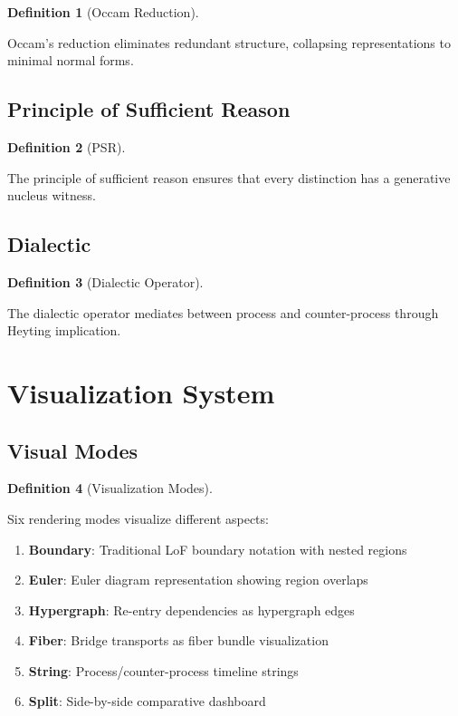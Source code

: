 \documentclass{amsart}
\theoremstyle{definition}
\newtheorem{definition}{Definition}[section]
\theoremstyle{remark}
\begin{document}
\begin{definition}[Occam Reduction]
\label{def:occam}
\uses{}

Occam's reduction eliminates redundant structure, collapsing representations to minimal normal forms.
\end{definition}

\subsection{Principle of Sufficient Reason}
\label{sec:psr}

\begin{definition}[PSR]
\label{def:psr}
\uses{}

The principle of sufficient reason ensures that every distinction has a generative nucleus witness.
\end{definition}

\subsection{Dialectic}
\label{sec:dialectic}

\begin{definition}[Dialectic Operator]
\label{def:dialectic}
\uses{}

The dialectic operator mediates between process and counter-process through Heyting implication.
\end{definition}

\section{Visualization System}

\subsection{Visual Modes}
\label{sec:visual-modes}

\begin{definition}[Visualization Modes]
\label{def:visual-modes}
\uses{}

Six rendering modes visualize different aspects:
\begin{enumerate}
\item \textbf{Boundary}: Traditional LoF boundary notation with nested regions
\item \textbf{Euler}: Euler diagram representation showing region overlaps
\item \textbf{Hypergraph}: Re-entry dependencies as hypergraph edges
\item \textbf{Fiber}: Bridge transports as fiber bundle visualization
\item \textbf{String}: Process/counter-process timeline strings
\item \textbf{Split}: Side-by-side comparative dashboard
\end{enumerate}
\end{definition}
\end{document}
